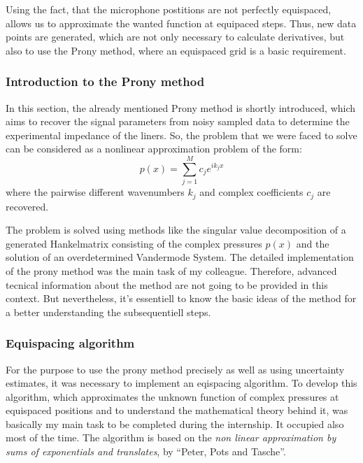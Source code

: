 \documentclass{article}
\begin{document}
Using the fact, that the microphone postitions are not perfectly equispaced, allows us to approximate the wanted function at equipaced steps.
Thus, new data points are generated, which are not only necessary to calculate derivatives, but also to use the Prony method, where an equispaced grid is a basic requirement. 

\subsubsection{Introduction to the Prony method}
In this section, the already mentioned Prony method is shortly introduced, which aims to recover the signal parameters from noisy sampled data to determine the experimental impedance of the liners.
So, the problem that we were faced to solve can be considered as a nonlinear approximation problem of the form:
\begin{equation}\label{eqn: expsum}
 p(x)=\sum\limits_{j=1}^M c_{j}e^{ik_{j}x} 
\end{equation}
where the pairwise different wavenumbers $k_{j}$ and complex coefficients $c_{j}$ are recovered.

The problem is solved using methods like the singular value decomposition of a generated Hankelmatrix consisting of the complex pressures $p(x)$ and the solution of an overdetermined Vandermode System.
The detailed implementation of the prony method was the main task of my colleague.
Therefore, advanced tecnical information about the method are not going to be provided in this context.
But nevertheless, it's essentiell to know the basic ideas of the method for a better understanding the subsequentiell steps. 


\subsubsection{Equispacing algorithm}
For the purpose to use the prony method precisely as well as using uncertainty estimates, it was necessary to implement an eqispacing algorithm.
To develop this algorithm, which approximates the unknown function of complex pressures at equispaced positions and to understand the mathematical theory behind it, was basically my main task to be completed during the internship.
It occupied also most of the time.
The algorithm is based on the \textit{non linear approximation by sums of exponentials and translates}, by “Peter, Pots and Tasche”. \cite{Peter2011} 
\end{document}
